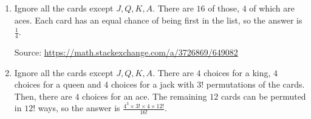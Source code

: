 \begin{enumerate}[label=(\alph*)]
\item  Ignore all the cards except $J,Q,K,A$.  There are $16$ of those, $4$ of which are aces.  Each card has an equal chance of being first in the list, so the answer is $\frac 14$.

Source: \url{https://math.stackexchange.com/a/3726869/649082}

\item Ignore all the cards except $J,Q,K,A$. There are $4$ choices for a king, $4$ choices for a queen and $4$ choices for a jack with $3!$ permutations of the cards. Then, there are $4$ choices for an ace. The remaining $12$ cards can be permuted in $12!$
ways, so the answer is $\frac{4^{3}\times3!\times4\times12!}{16!}$. 

\end{enumerate}